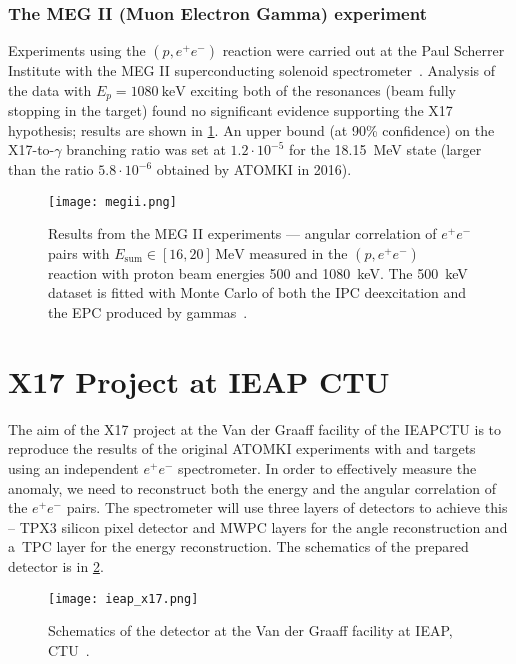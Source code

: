 			\subsubsection{The MEG II (Muon Electron Gamma) experiment}
				Experiments using the $(p,e^+e^-)$ reaction were carried out at the Paul Scherrer Institute with the MEG II superconducting solenoid spectrometer~\cite{megii}. Analysis of the data with $E_p = \qty{1080}{\keV}$ exciting both of the resonances (beam fully stopping in the target) found no significant evidence supporting the X17 hypothesis; results are shown in \cref{fig:megii}. An upper bound (at 90\% confidence) on the X17\nobreakdash-to\nobreakdash-$\gamma$ branching ratio was set at $1.2\cdot10^{-5}$ for the \qty{18.15}{\MeV} state (larger than the ratio $5.8\cdot10^{-6}$ obtained by ATOMKI in 2016).
				
				\begin{figure}
					\centering
					\texttt{[image: megii.png]}
					\caption{Results from the MEG II experiments --- angular correlation of $e^+e^-$ pairs with $E_\text{sum} \in [16,20]\,\text{MeV}$ measured in the $(p,e^+e^-)$ reaction with proton beam energies 500 and 1080~keV. The 500~keV dataset is fitted with Monte Carlo of both the \ac{IPC} deexcitation and the \ac{EPC} produced by gammas~\cite{megii}.}
					\label{fig:megii}
				\end{figure}
			
	
	\section{X17 Project at IEAP CTU}
	\label{sec:IEAP}
		The aim of the X17 project at the Van der Graaff facility of the \acl{IEAPCTU} is to reproduce the results of the original ATOMKI experiments with  and  targets using an independent $e^+e^-$ spectrometer. In order to effectively measure the anomaly, we need to reconstruct both the energy and the angular correlation of the $e^+e^-$ pairs. The spectrometer will use three layers of detectors to achieve this -- \acf{TPX3} silicon pixel detector and \acf{MWPC} layers for the angle reconstruction and a~\acf{TPC} layer for the energy reconstruction. The schematics of the prepared detector is in \cref{fig:ieap}.
			
			\begin{figure}
				\centering
				\texttt{[image: ieap\_x17.png]}
				\caption{Schematics of the detector at the Van der Graaff facility at IEAP, CTU~\cite{x17_utef}.}
				\label{fig:ieap}
			\end{figure}
		
